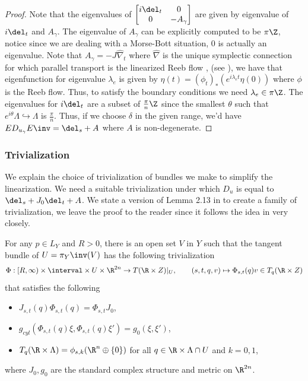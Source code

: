 \begin{proof}

Note that the eigenvalues of $\begin{bmatrix} i\del_t & 0\\0&-A_\gamma \end{bmatrix} $ are given by eigenvalue of $i\del_t$ and $A_\gamma$. The eigenvalue of $A_\gamma$ can be explicitly computed to be $\pi \Z$, notice since we are dealing with  a Morse-Bott situation, 0 is actually an eigenvalue. Note that $A_\gamma = -J \hat {\nabla}_t$ where $\hat{\nabla}$ is the unique symplectic connection for which parallel transport is the linearized Reeb flow , (see \cite{wendlSFT} ), we have that eigenfunction for eigenvalue $\lambda_e$ is given by $ \eta(t) = (\phi_t)_*(e^{i\lambda_e t} \eta(0 ))$ where $\phi$ is the Reeb flow. Thus, to satisfy the boundary conditions we need $\lambda_e \in \pi \Z$. The eigenvalues for $i\del_t$ are a subset of $\frac{\pi}{n}\Z$ since the smallest $\theta$ such that $e^{i\theta} \Lambda \hookrightarrow \Lambda$ is $\frac{\pi}{n}$. Thus, if we choose $\delta$ in the given range, we'd have $ED_{u_\gamma}E\inv = \del_s + A$ where $A$ is non-degenerate.
\end{proof}



\subsubsection{Trivialization }

We explain the choice of trivialization of bundles we make to simplify the linearization. We need a suitable trivialization under which $D_u$ is equal to  $\del_s + J_0 \del_t + A$. We state a version of Lemma 2.13 in \cite{schm} to create a family of trivialization, we leave the proof to the reader since it follows the idea in \cite{schm} very closely.

\begin{lemma} \label{lemma:trvlz}
For any $p\in L_Y$ and $R>0$, there is an open set $V$ in $Y$ such that the tangent bundle of $U = \pi_Y \inv (V)$ has the following trivialization 
$$\Phi : [R,\infty) \times \interval \times U \times \R^{2n} \to T(\R \times Z)|_{U},\qquad (s,t,q,v) \mapsto \Phi_{s,t}(q)v\in T_q(\R \times Z)$$ that satisfies the following
\begin{itemize}
    \item $J_{s,t}(q)\Phi_{s,t}(q) = \Phi_{s,t}J_0$,
    \item $g_{cyl} (\Phi_{s,t}(q)\xi ,\Phi_{s,t}(q)\xi' ) = g_0(\xi,\xi')$,
    \item $T_q (\R \times \Lambda) = \phi_{s,k} (\R ^n \oplus \{0 \})  $ for all $q\in \R \times \Lambda \cap U$ and $k=0,1$,
\end{itemize}

where $J_0,g_0$ are the standard complex structure and metric on $\R^{2n}$.
\end{lemma}


